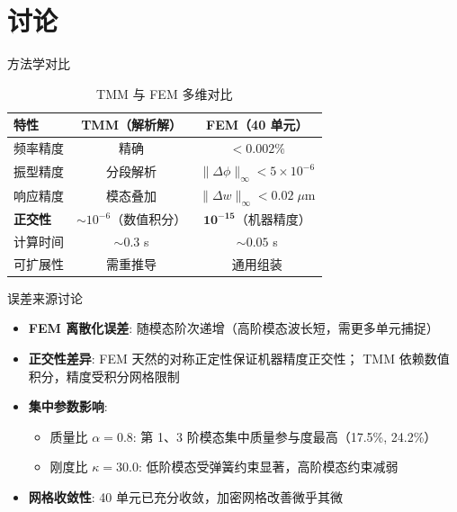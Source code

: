 \documentclass[12pt,aspectratio=169]{ctexbeamer}
\begin{document}
\section{讨论}

\begin{frame}{方法学对比}
  \begin{table}
    \centering
    \caption{TMM 与 FEM 多维对比}
    \begin{tabular}{p{3cm}cc}
      \toprule
      特性 & TMM（解析解） & FEM（40 单元）\\
      \midrule
      频率精度 & 精确 & $<0.002\%$ \\
      振型精度 & 分段解析 & $\|\Delta\phi\|_\infty < 5\times10^{-6}$ \\
      响应精度 & 模态叠加 & $\|\Delta w\|_\infty < 0.02\;\mu\text{m}$ \\
      \textbf{正交性} & $\sim 10^{-6}$（数值积分） & $\mathbf{10^{-15}}$（机器精度）\\
      计算时间 & $\sim 0.3$ s & $\sim 0.05$ s \\
      可扩展性 & 需重推导 & 通用组装 \\
      \bottomrule
    \end{tabular}
  \end{table}
\end{frame}

\begin{frame}{误差来源讨论}
  \begin{itemize}
    \item \textbf{FEM 离散化误差}: 随模态阶次递增（高阶模态波长短，需更多单元捕捉）
    \item \textbf{正交性差异}: FEM 天然的对称正定性保证机器精度正交性；
          TMM 依赖数值积分，精度受积分网格限制
    \item \textbf{集中参数影响}:
      \begin{itemize}
        \item 质量比 $\alpha=0.8$: 第 1、3 阶模态集中质量参与度最高（17.5\%, 24.2\%）
        \item 刚度比 $\kappa=30.0$: 低阶模态受弹簧约束显著，高阶模态约束减弱
      \end{itemize}
    \item \textbf{网格收敛性}: 40 单元已充分收敛，加密网格改善微乎其微
  \end{itemize}
\end{frame}
\end{document}
